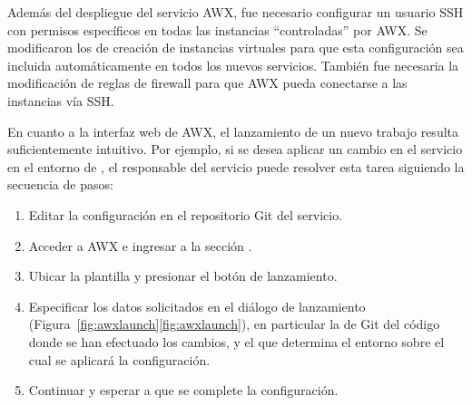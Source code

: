 Además del despliegue del servicio AWX, fue necesario configurar un
usuario SSH con permisos específicos en todas las instancias
``controladas'' por AWX. Se modificaron los  de
creación de instancias virtuales para que esta configuración sea
incluida automáticamente en todos los nuevos servicios. También fue
necesaria la modificación de reglas de firewall para que AWX pueda
conectarse a las instancias vía SSH.

En cuanto a la interfaz web de AWX, el lanzamiento de un nuevo trabajo
resulta suficientemente intuitivo. Por ejemplo, si se desea aplicar un
cambio en el servicio  en el entorno de
, el responsable del servicio puede resolver esta
tarea siguiendo la secuencia de pasos:
%
\begin{enumerate}
\item Editar la configuración en el repositorio Git del servicio.
\item Acceder a AWX e ingresar a la sección .
\item Ubicar la plantilla  y presionar el botón
  de lanzamiento.
\item Especificar los datos solicitados en el diálogo de lanzamiento
  (\iflatexml{}Figura~\ref{fig:awxlaunch}\else\autoref{fig:awxlaunch}\fi),
  en particular la  de Git del código donde se han efectuado
  los cambios, y el  que determina el entorno sobre el cual
  se aplicará la configuración.
\item Continuar y esperar a que se complete la configuración.
\end{enumerate}
%
